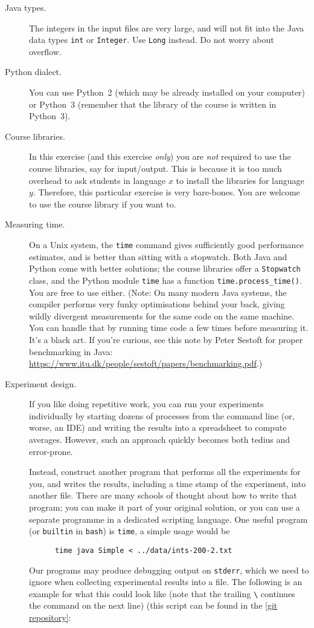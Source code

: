 \documentclass{tufte-handout}
\begin{document}
\begin{description}
  \item[Java types.] The integers in the input files are very large, and will not fit into the Java data types \texttt{int} or \texttt{Integer}.
    Use \texttt{Long} instead.
    Do not worry about overflow.
  \item[Python dialect.] You can use Python~2 (which may be already installed on your computer) or Python~3 (remember that the library of the course is written in Python~3).
  \item[Course libraries.]
    In this exercise (and this exercise \emph{only}) you are \emph{not} required to use the course libraries, say for input/output.
    This is because it is too much overhead to ask students in language $x$ to install the libraries for language $y$.
    Therefore, this particular exercise is very bare-bones.
    You are welcome to use the course library if you want to.
  \item[Measuring time.]
    On a Unix system, the \texttt{time} command gives sufficiently good performance estimates, and is better than sitting with a stopwatch.
    Both Java and Python come with better solutions; the course libraries offer a \texttt{Stopwatch} class, and the Python module \texttt{time} has a function \texttt{time.process\_time()}. You are free to use either. 
    (Note: On many modern Java systems, the compiler performs very funky
    optimisations behind your back, giving wildly divergent measurements for
    the same code on the same machine.  You can handle that by running time
    code a few times before measuring it.  It's a black art.  If you're
    curious, see this note by Peter Sestoft for proper benchmarking in Java:
    \url{https://www.itu.dk/people/sestoft/papers/benchmarking.pdf}.)
  \item[Experiment design.]
    If you like doing repetitive work, you  can run your experiments individually by starting dozens of processes from the command line (or, worse, an IDE) and writing the results into a spreadsheet to compute averages.
    However, such an approach quickly becomes both tedius and error-prone.

    Instead, construct another program that performs all the experiments for you, and writes the results, including a time stamp of the experiment, into another file.
    There are many schools of thought about how to write that program; you can make it part of your original solution, or you can use a separate programme in a dedicated scripting language.
    One useful program (or \texttt{builtin} in \texttt{bash}) is \texttt{time}, a simple usage would be 
    \begin{lstlisting}
      time java Simple < ../data/ints-200-2.txt
    \end{lstlisting}
    Our programs may produce debugging output on \texttt{stderr}, which we need to ignore when collecting experimental results into a file. 
    The following is an example for what this could look like (note that the trailing \verb+\+ continues the command on the next line) (this script can be found in the \href{https://bitbucket.org/rikj/bads-labs/src/master/foursum/src/simpleExp.sh}{[git repository]}:
    


\end{description}
\end{document}
